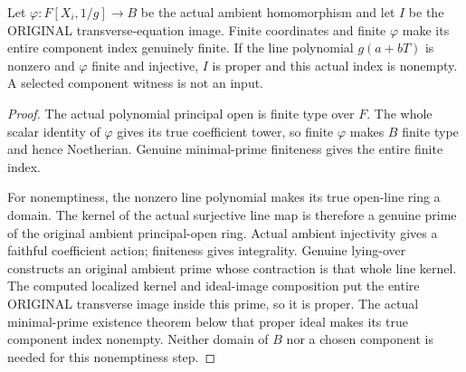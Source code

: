 \begin{theorem}
\label{algebra:line-preimage-actual-components}
\leanok
{}
Let $\varphi:F[X_i,1/g]\to B$ be the actual ambient homomorphism and
let $I$ be the ORIGINAL transverse-equation image. Finite coordinates
and finite $\varphi$ make its entire component index genuinely finite.
If the line polynomial $g(a+bT)$ is nonzero and $\varphi$ finite and
injective, $I$ is proper and this actual index is nonempty. A selected
component witness is not an input.
\end{theorem}
\begin{proof}
The actual polynomial principal open is finite type over $F$. The
whole scalar identity of $\varphi$ gives its true coefficient tower,
so finite $\varphi$ makes $B$ finite type and hence Noetherian. Genuine
minimal-prime finiteness gives the entire finite index.

For nonemptiness, the nonzero line polynomial makes its true open-line
ring a domain. The kernel of the actual surjective line map is therefore
a genuine prime of the original ambient principal-open ring. Actual
ambient injectivity gives a faithful coefficient action; finiteness
gives integrality. Genuine lying-over constructs an original ambient
prime whose contraction is that whole line kernel. The computed
localized kernel and ideal-image composition put the entire ORIGINAL
transverse image inside this prime, so it is proper. The actual
minimal-prime existence theorem below that proper ideal makes its
true component index nonempty. Neither domain of $B$ nor a chosen
component is needed for this nonemptiness step.
\end{proof}

